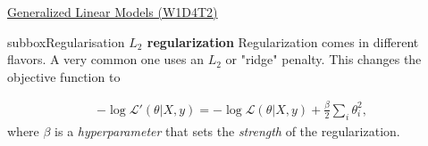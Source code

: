 \begin{textbox}{\href{https://compneuro.neuromatch.io/tutorials/W1D4_GeneralizedLinearModels/student/W1D4_Tutorial2.html}{Generalized Linear Models (W1D4T2)} }
\begin{subbox}{subbox}{Regularisation 
}
\textbf{$L_2$ regularization}
Regularization comes in different flavors. A very common one uses an $L_2$ or "ridge" penalty. This changes the objective function to

\begin{align}
-\log\mathcal{L}'(\theta | X, y)=
-\log\mathcal{L}(\theta | X, y) +\frac\beta2\sum_i\theta_i^2,
\end{align}
where $\beta$ is a \textit{hyperparameter} that sets the \textit{strength} of the regularization.

\end{subbox}
\end{textbox}
